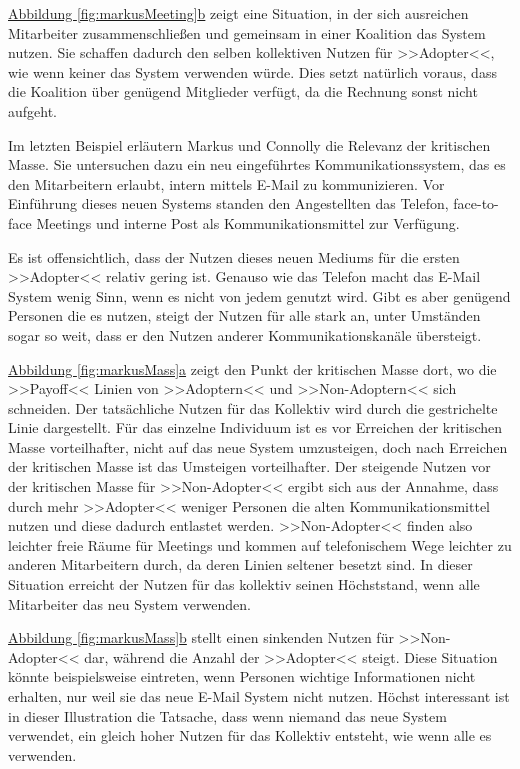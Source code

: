 \hyperref[fig:markusMeeting]{Abbildung \ref*{fig:markusMeeting}b} zeigt eine Situation, in der sich ausreichen Mitarbeiter zusammenschließen und gemeinsam in einer Koalition das System nutzen. Sie schaffen dadurch den selben kollektiven Nutzen für >>Adopter<<, wie wenn keiner das System verwenden würde. Dies setzt natürlich voraus, dass die Koalition über genügend Mitglieder verfügt, da die Rechnung sonst nicht aufgeht.

\medskip Im letzten Beispiel erläutern Markus und Connolly die Relevanz der kritischen Masse. Sie untersuchen dazu ein neu eingeführtes Kommunikationssystem, das es den Mitarbeitern erlaubt, intern mittels E-Mail zu kommunizieren. Vor Einführung dieses neuen Systems standen den Angestellten das Telefon, face-to-face Meetings und interne Post als Kommunikationsmittel zur Verfügung. 

Es ist offensichtlich, dass der Nutzen dieses neuen Mediums für die ersten >>Adopter<< relativ gering ist. Genauso wie das Telefon macht das E-Mail System wenig Sinn, wenn es nicht von jedem genutzt wird. Gibt es aber genügend Personen die es nutzen, steigt der Nutzen für alle stark an, unter Umständen sogar so weit, dass er den Nutzen anderer Kommunikationskanäle übersteigt. 

\medskip \hyperref[fig:markusMass]{Abbildung \ref*{fig:markusMass}a} zeigt den Punkt der kritischen Masse dort, wo die >>Payoff<< Linien von >>Adoptern<< und >>Non-Adoptern<< sich schneiden. Der tatsächliche Nutzen für das Kollektiv wird durch die gestrichelte Linie dargestellt. Für das einzelne Individuum ist es vor Erreichen der kritischen Masse vorteilhafter, nicht auf das neue System umzusteigen, doch nach Erreichen der kritischen Masse ist das Umsteigen vorteilhafter. Der steigende Nutzen vor der kritischen Masse für >>Non-Adopter<< ergibt sich aus der Annahme, dass durch mehr >>Adopter<< weniger Personen die alten Kommunikationsmittel nutzen und diese dadurch entlastet werden. >>Non-Adopter<< finden also leichter freie Räume für Meetings und kommen auf telefonischem Wege leichter zu anderen Mitarbeitern durch, da deren Linien seltener besetzt sind. In dieser Situation erreicht der Nutzen für das kollektiv seinen Höchststand, wenn alle Mitarbeiter das neu System verwenden. 

\medskip \hyperref[fig:markusMass]{Abbildung \ref*{fig:markusMass}b} stellt einen sinkenden Nutzen für >>Non-Adopter<< dar, während die Anzahl der >>Adopter<< steigt. Diese Situation könnte beispielsweise eintreten, wenn Personen wichtige Informationen nicht erhalten, nur weil sie das neue E-Mail System nicht nutzen. Höchst interessant ist in dieser Illustration die Tatsache, dass wenn niemand das neue System verwendet, ein gleich hoher Nutzen für das Kollektiv entsteht, wie wenn alle es verwenden.


